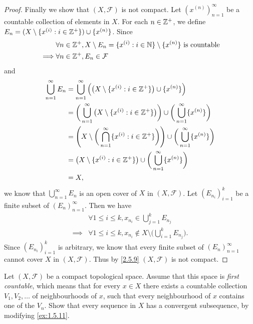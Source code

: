 \begin{proof}
  Finally we show that \((X, \mathcal{F})\) is not compact.
  Let \((x^{(n)})_{n = 1}^\infty\) be a countable collection of elements in \(X\).
  For each \(n \in \mathbb{Z}^+\), we define \(E_n = (X \setminus \{x^{(i)} : i \in \mathbb{Z}^+\}) \cup \{x^{(n)}\}\).
  Since
  \begin{align*}
             & \forall n \in \mathbb{Z}^+, X \setminus E_n = \{x^{(i)} : i \in \mathbb{N}\} \setminus \{x^{(n)}\} \text{ is countable} \\
    \implies & \forall n \in \mathbb{Z}^+, E_n \in \mathcal{F}
  \end{align*}
  and
  \begin{align*}
    \bigcup_{n = 1}^\infty E_n & = \bigcup_{n = 1}^\infty \Big(\big(X \setminus \{x^{(i)} : i \in \mathbb{Z}^+\}\big) \cup \{x^{(n)}\}\Big)                                        \\
                               & = \bigg(\bigcup_{n = 1}^\infty \big(X \setminus \{x^{(i)} : i \in \mathbb{Z}^+\}\big)\bigg) \cup \bigg(\bigcup_{n = 1}^\infty \{x^{(n)}\}\bigg)   \\
                               & = \Bigg(X \setminus \bigg(\bigcap_{n = 1}^\infty \{x^{(i)} : i \in \mathbb{Z}^+\}\bigg)\Bigg) \cup \bigg(\bigcup_{n = 1}^\infty \{x^{(n)}\}\bigg) \\
                               & = \big(X \setminus \{x^{(i)} : i \in \mathbb{Z}^+\}\big) \cup \bigg(\bigcup_{n = 1}^\infty \{x^{(n)}\}\bigg)                                      \\
                               & = X,
  \end{align*}
  we know that \(\bigcup_{n = 1}^\infty E_n\) is an open cover of \(X\) in \((X, \mathcal{F})\).
  Let \((E_{n_i})_{i = 1}^k\) be a finite subset of \((E_n)_{n = 1}^\infty\).
  Then we have
  \begin{align*}
             & \forall 1 \leq i \leq k, x_{n_i} \in \bigcup_{j = 1}^k E_{n_j}                             \\
    \implies & \forall 1 \leq i \leq k, x_{n_i} \notin X \setminus \bigg(\bigcup_{i = 1}^k E_{n_j}\bigg).
  \end{align*}
  Since \((E_{n_i})_{i = 1}^k\) is arbitrary, we know that every finite subset of \((E_n)_{n = 1}^\infty\) cannot cover \(X\) in \((X, \mathcal{F})\).
  Thus by \cref{2.5.9} \((X, \mathcal{F})\) is not compact.
\end{proof}

\setcounter{ex}{8}
\begin{ex}\label{ex:2.5.9}
  Let \((X, \mathcal{F})\) be a compact topological space.
  Assume that this space is \emph{first countable}, which means that for every \(x \in X\) there exists a countable collection \(V_1 , V_2 , \dots\) of neighbourhoods of \(x\), such that every neighbourhood of \(x\) contains one of the \(V_n\).
  Show that every sequence in \(X\) has a convergent subsequence, by modifying \cref{ex:1.5.11}.
\end{ex}

